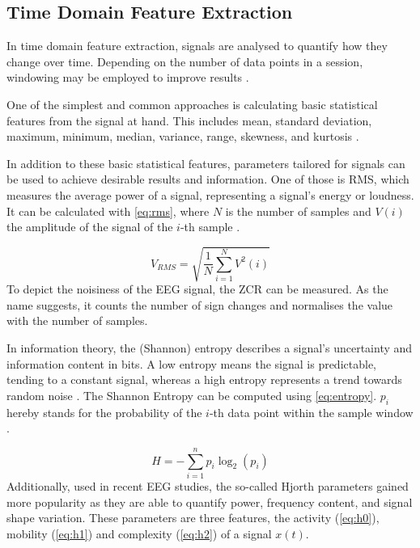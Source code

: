     \subsection{Time Domain Feature Extraction} \label{sec:time-domain}
      In time domain feature extraction, signals are analysed to quantify how they change over time. Depending on the number of data points in a session, windowing may be employed to improve results \cite{singh2023trends}. \par
      One of the simplest and common approaches is calculating basic statistical features from the signal at hand. This includes mean, standard deviation, maximum, minimum, median, variance, range, skewness, and kurtosis \cite{singh2023trends}. \par
      In addition to these basic statistical features, parameters tailored for signals can be used to achieve desirable results and information. One of those is \ac{RMS}, which measures the average power of a signal, representing a signal's energy or loudness. It can be calculated with \autoref{eq:rms}, where $N$ is the number of samples and $V(i)$ the amplitude of the signal of the $i$-th sample \cite{moulin2003rms}. \par
      \begin{equation}
        V_{RMS} = \sqrt{\frac{1}{N} \sum_{i=1}^{N} V^{2}(i)} \label{eq:rms}
      \end{equation}
      To depict the noisiness of the \ac{EEG} signal, the \ac{ZCR} can be measured. As the name suggests, it counts the number of sign changes and normalises the value with the number of samples. \par
      In information theory, the (Shannon) entropy describes a signal's uncertainty and information content in bits. A low entropy means the signal is predictable, tending to a constant signal, whereas a high entropy represents a trend towards random noise \cite{BEIN2006101}. The Shannon Entropy can be computed using \autoref{eq:entropy}. $p_{i}$ hereby stands for the probability of the $i$-th data point within the sample window \cite{gray2011entropy}. \par
      \begin{equation}
        H = - \sum_{i=1}^{n} p_{i}\log_{2}(p_{i})
        \label{eq:entropy}
      \end{equation}
      Additionally, used in recent \ac{EEG} studies, the so-called Hjorth parameters gained more popularity as they are able to quantify power, frequency content, and signal shape variation. These parameters are three features, the activity (\autoref{eq:h0}), mobility (\autoref{eq:h1}) and complexity (\autoref{eq:h2}) of a signal $x(t)$.
